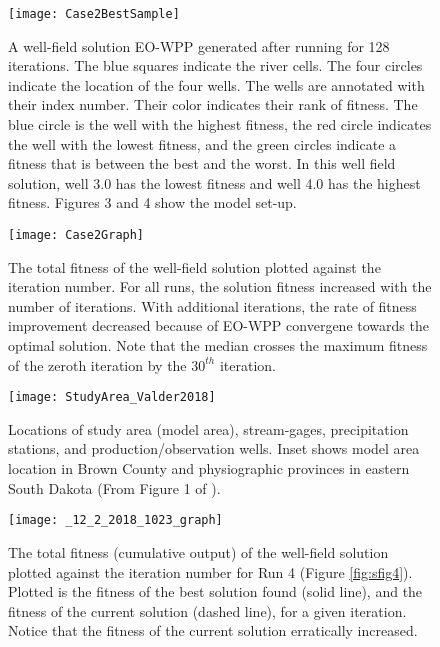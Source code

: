\documentclass[authoryear]{elsarticle}
\begin{document}
\begin{figure}
\centering
\texttt{[image: Case2BestSample]}
\caption{A well-field solution EO-WPP generated after running for 128 iterations. The blue squares indicate the river cells. The four circles indicate the location of the four wells. The wells are annotated with their index number. Their color indicates their rank of fitness. The blue circle is the well with the highest fitness, the red circle indicates the well with the lowest fitness, and the green circles indicate a fitness that is between the best and the worst. In this well field solution, well 3.0 has the lowest fitness and well 4.0 has the highest fitness. Figures 3 and 4 show the model set-up.}
\label{fig:Case2BestSample}
\end{figure}

\begin{figure}
\centering
\texttt{[image: Case2Graph]}
\caption{The total fitness of the well-field solution plotted against the iteration number. For all runs, the solution fitness increased with the number of iterations. With additional iterations, the rate of fitness improvement decreased because of EO-WPP convergene towards the optimal solution. Note that the median crosses the maximum fitness of the zeroth iteration by the $30^{th}$ iteration.}
\label{fig:Case2Graph}
\end{figure}

\begin{figure}
\centering
\texttt{[image: StudyArea\_Valder2018]}
\caption{Locations of study area (model area), stream-gages, precipitation stations, and production/observation wells. Inset
shows model area location in Brown County and physiographic provinces in eastern South Dakota (From Figure 1 of \citet{valder2018revised}).}
\label{fig:StudyArea_Valder2018}
\end{figure}

\begin{figure}
\centering
\texttt{[image: \_12\_2\_2018\_1023\_graph]}
\caption{The total fitness (cumulative output) of the well-field solution plotted against the iteration number for Run 4 (Figure \ref{fig:sfig4}). Plotted is the fitness of the best solution found (solid line), and the fitness of the current solution (dashed line), for a given iteration. Notice that the fitness of the current solution erratically increased.}
\label{fig:Case3Graph}
\end{figure}
\end{document}
